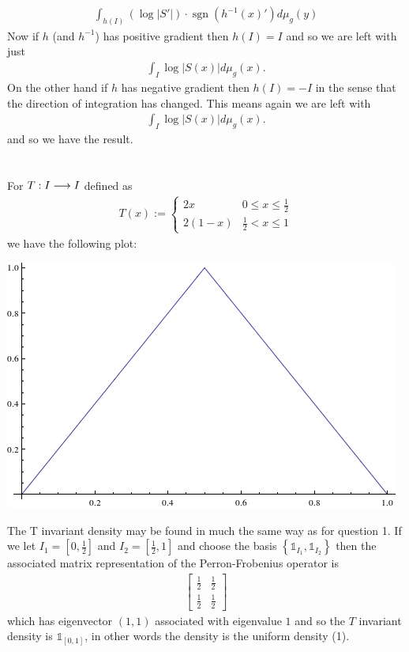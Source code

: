 \documentclass{unswmaths}
\begin{document}
\begin{align}
\int_{h(I)} \left( \log|S'|\right)\cdot \operatorname{sgn}(h^{-1}(x)')d\mu_g(y)
\end{align}
Now if $ h $ (and $ h^{-1} $) has positive gradient then  $ h(I) = I $ and so we are left with just
\begin{align}
	\int_{I} \log|S(x)| d\mu_g(x).
\end{align}
On the other hand if $ h $ has negative gradient then $ h(I) = -I $ in the sense that the direction of integration has changed. This means again we are left with
\begin{align}
	\int_{I} \log|S(x)| d\mu_g(x).
\end{align}
and so we have the result.
\section{}
\subsection{}
For $ T : I \longrightarrow I $ defined as
\begin{align}
  T(x) := 
  \begin{cases}
    2x  & 0 \leq x \leq \frac{1}{2} \\
    2(1-x) & \frac{1}{2} < x \leq 1
  \end{cases}
\end{align}
we have the following plot:


\includegraphics[scale=0.5]{qn_4_plot}

The T invariant density may be found in much the same way as for question 1.
If we let $ I_1 = \left[0,\frac{1}{2}\right] $ and $ I_2 = \left[ \frac{1}{2}, 1 \right] $ and choose the basis
  $\left\{ \mathds{1}_{I_1}, \mathds{1}_{I_2} \right\} $ then the associated matrix representation of the Perron-Frobenius operator is 
\begin{align}
  \left[ \begin{array}{cc} \frac{1}{2} & \frac{1}{2} \\ \frac{1}{2} & \frac{1}{2} \end{array} \right]
\end{align}
which has eigenvector $ (1,1) $ associated with eigenvalue $ 1 $ and so the $ T $ invariant density is $ \mathds{1}_{[0,1]} $, in other words the density is the uniform density (1).
\end{document}
